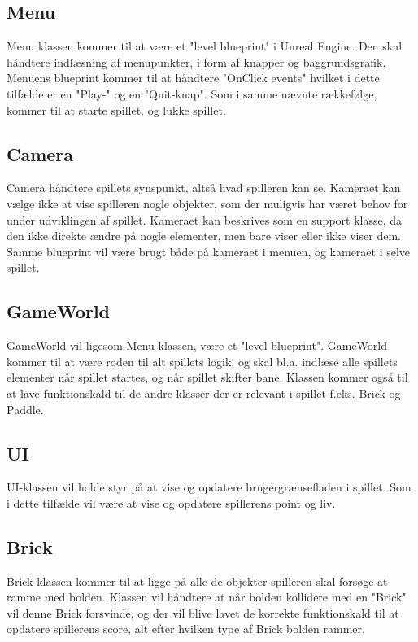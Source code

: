 \subsection{Menu}
Menu klassen kommer til at være et "level blueprint" i Unreal Engine. Den skal håndtere indlæsning af menupunkter, i form af knapper og baggrundsgrafik. Menuens blueprint kommer til at håndtere "OnClick events" hvilket i dette tilfælde er en "Play-" og en "Quit-knap". Som i samme nævnte rækkefølge, kommer til at starte spillet, og lukke spillet.

\subsection{Camera}
Camera håndtere spillets synspunkt, altså hvad spilleren kan se. Kameraet kan vælge ikke at vise spilleren nogle objekter, som der muligvis har været behov for under udviklingen af spillet. Kameraet kan beskrives som en support klasse, da den ikke direkte ændre på nogle elementer, men bare viser eller ikke viser dem. Samme blueprint vil være brugt både på kameraet i menuen, og kameraet i selve spillet.

\subsection{GameWorld}
GameWorld vil ligesom Menu-klassen, være et "level blueprint". GameWorld kommer til at være roden til alt spillets logik, og skal bl.a. indlæse alle spillets elementer når spillet startes, og når spillet skifter bane. Klassen kommer også til at lave funktionskald til de andre klasser der er relevant i spillet f.eks. Brick og Paddle.

\subsection{UI}
UI-klassen vil holde styr på at vise og opdatere brugergrænsefladen i spillet. 
Som i dette tilfælde vil være at vise og opdatere spillerens point og liv.

\subsection{Brick}
Brick-klassen kommer til at ligge på alle de objekter spilleren skal forsøge at ramme med bolden. Klassen vil håndtere at når bolden kollidere med en "Brick" vil denne Brick forsvinde, og der vil blive lavet de korrekte funktionskald til at opdatere spillerens score, alt efter hvilken type af Brick bolden rammer.

